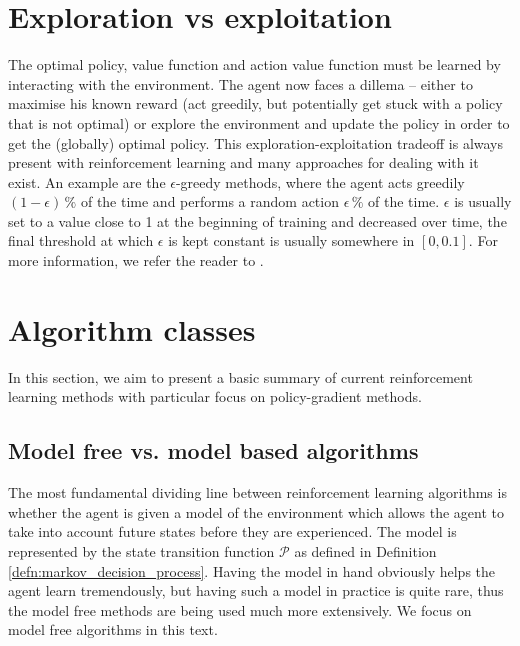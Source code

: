 \section{Exploration vs exploitation}
\label{section:explo_vs_exploit}
The optimal policy, value function and action value function must be learned by interacting with the environment. The agent now faces a dillema -- either to maximise his known reward (act greedily, but potentially get stuck with a policy that is not optimal) or explore the environment and update the policy in order to get the (globally) optimal policy. This exploration-exploitation tradeoff is always present with reinforcement learning and many approaches for dealing with it exist. An example are the $\epsilon$-greedy methods, where the agent acts greedily $(1-\epsilon) \, \%$ of the time and performs a random action $\epsilon \, \%$ of the time. $\epsilon$ is usually set to a value close to 1 at the beginning of training and decreased over time, the final threshold at which $\epsilon$ is kept constant is usually somewhere in $[0,0.1]$. For more information, we refer the reader to \cite[Section 2.7.]{sutton2018reinforcement}.

\section{Algorithm classes}
In this section, we aim to present a basic summary of current reinforcement learning methods with particular focus on policy-gradient methods.
\subsection{Model free vs. model based algorithms}
The most fundamental dividing line between reinforcement learning algorithms is whether the agent is given a model of the environment which allows the agent to take into account future states before they are experienced. The model is represented by the state transition function $\mathcal{P}$ as defined in Definition \ref{defn:markov_decision_process}. Having the model in hand obviously helps the agent learn tremendously, but having such a model in practice is quite rare, thus the model free methods are being used much more extensively. We focus on model free algorithms in this text.

